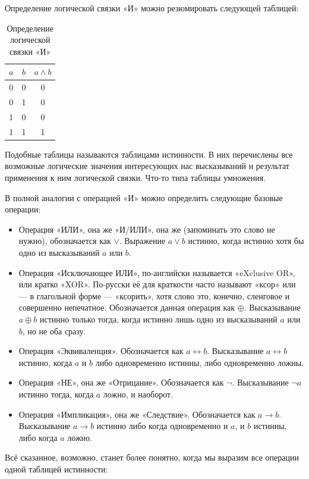 Определение логической связки «И» можно резюмировать следующей таблицей:

\begin{table}[h]
\centering
\begin{tabular}{c c | c}
$a$ & $b$ & $a \land b$ \\
\hline
0 & 0 & 0 \\
0 & 1 & 0 \\
1 & 0 & 0 \\
1 & 1 & 1
\end{tabular}
\caption{Определение логической связки «И»}\label{table:logic-and}
\end{table}


Подобные таблицы называются таблицами истинности. В них перечислены все возможные логические значения интересующих нас высказываний и результат применения к ним логической связки. Что-то типа таблицы умножения.

В полной аналогии с операцией «И» можно определить следующие базовые операции:

\begin{itemize}
\item Операция «ИЛИ», она же «И/ИЛИ», она же  (запоминать это слово не нужно), обозначается как $\lor$. Выражение $a\lor b$ истинно, когда истинно хотя бы одно из высказываний $a$ или $b$.
\item Операция «Исключающее ИЛИ», по-английски называется «eXclusive OR», или кратко «XOR». По-русски её для краткости часто называют «ксор» или — в глагольной форме — «ксорить», хотя слово это, конечно, сленговое и совершенно непечатное. Обозначается данная операция как $\oplus$. Высказывание $a \oplus b$ истинно только тогда, когда истинно лишь одно из высказываний $a$ или $b$, но не оба сразу.
\item Операция «Эквиваленция». Обозначается как $a \leftrightarrow b$. Высказывание $a \leftrightarrow b$ истинно, когда $a$ и $b$ либо одновременно истинны, либо одновременно ложны.
\item Операция «НЕ», она же «Отрицание». Обозначается как $\neg$. Высказывание $\neg a$ истинно тогда, когда $a$ ложно, и наоборот.
\item Операция «Импликация», она же «Следствие». Обозначается как $a \to b$. Высказывание $a \to b$ истинно либо когда одновременно и $a$, и $b$ истинны, либо когда $a$ ложно.
\end{itemize}

Всё сказанное, возможно, станет более понятно, когда мы выразим все операции одной таблицей истинности:

